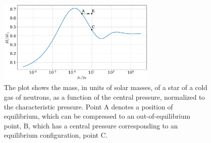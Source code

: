 \begin{figure}[!h]
    \centering
    \includegraphics[width=0.7\textwidth]{../scripts/figurer/fermi_stability.pdf}
    \caption{
        The plot shows the mass, in units of solar masses, of a star of a cold gas of neutrons, as a function of the central pressure, normalized to the characteristic pressure.
    Point A denotes a position of equilibrium, which can be compressed to an out-of-equilibrium point, B, which has a central pressure corresponding to an equilibrium configuration, point C.
    }
    \label{fig: fermi stability}
\end{figure}

